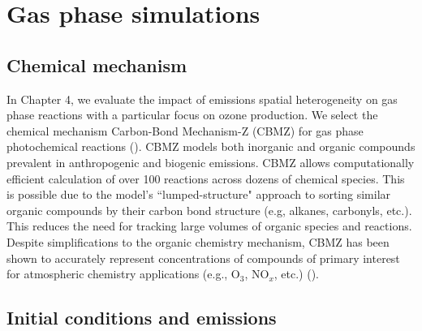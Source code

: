 \section{Gas phase simulations}

\subsection{Chemical mechanism}
In Chapter 4, we evaluate the impact of emissions spatial heterogeneity on gas phase reactions with a particular focus on ozone production. We select the chemical mechanism Carbon-Bond Mechanism-Z (CBMZ) for gas phase photochemical reactions (\cite{zaveri_new_1999}). CBMZ models both inorganic and organic compounds prevalent in anthropogenic and biogenic emissions. CBMZ allows computationally efficient calculation of over 100 reactions across dozens of chemical species. This is possible due to the model's ``lumped-structure" approach to sorting similar organic compounds by their carbon bond structure (e.g, alkanes, carbonyls, etc.). This reduces the need for tracking large volumes of organic species and reactions. Despite simplifications to the organic chemistry mechanism, CBMZ has been shown to accurately represent concentrations of compounds of primary interest for atmospheric chemistry applications (e.g., O$_3$, NO$_x$, etc.) (\cite{zaveri_new_1999}). 

\subsection{Initial conditions and emissions}\label{gas-phase-ics-and-emiss}

